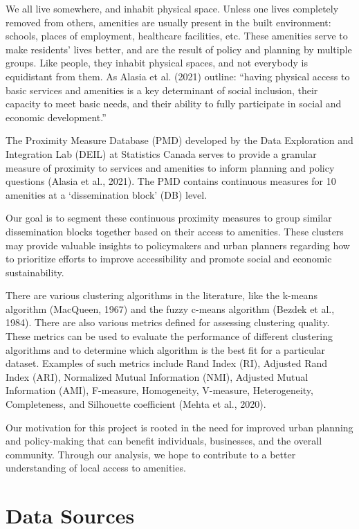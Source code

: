 \documentclass[11pt, a4paper]{article}
\begin{document}
We all live somewhere, and inhabit physical space. Unless one lives completely removed from others, amenities are usually present in the built environment: schools, places of employment, healthcare facilities, etc. These amenities serve to make residents’ lives better, and are the result of policy and planning by multiple groups. Like people, they inhabit physical spaces, and not everybody is equidistant from them. As Alasia et al. (2021) outline: “having physical access to basic services and amenities is a key determinant of social inclusion, their capacity to meet basic needs, and their ability to fully participate in social and economic development.”
\par
The Proximity Measure Database (PMD) developed by the Data Exploration and Integration Lab (DEIL) at Statistics Canada serves to provide a granular measure of proximity to services and amenities to inform planning and policy questions (Alasia et al., 2021). The PMD contains continuous measures for 10 amenities at a ‘dissemination block’ (DB) level.
\par
Our goal is to segment these continuous proximity measures to group similar dissemination blocks together based on their access to amenities. These clusters may provide valuable insights to policymakers and urban planners regarding how to prioritize efforts to improve accessibility and promote social and economic sustainability.
\par
There are various clustering algorithms in the literature, like the k-means algorithm (MacQueen, 1967) and the fuzzy c-means algorithm (Bezdek et al., 1984). There are also various metrics defined for assessing clustering quality. These metrics can be used to evaluate the performance of different clustering algorithms and to determine which algorithm is the best fit for a particular dataset. Examples of such metrics include Rand Index (RI), Adjusted Rand Index (ARI), Normalized Mutual Information (NMI), Adjusted Mutual Information (AMI), F-measure, Homogeneity, V-measure, Heterogeneity, Completeness, and Silhouette coefficient (Mehta et al., 2020).
\par
Our motivation for this project is rooted in the need for improved urban planning and policy-making that can benefit individuals, businesses, and the overall community. Through our analysis, we hope to contribute to a better understanding of local access to amenities.
 


\section*{Data Sources}
\end{document}
